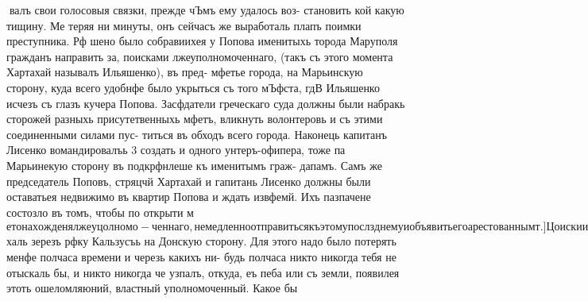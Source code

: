 валъ свои голосовыя связки, прежде чЪмъ ему удалось воз-
становить кой какую тищину. Ме теряя ни минуты, онъ
сейчасъ же выработаль плапъ поимки преступника. Рф шено
было собравиихея у Попова именитыхь торода Маруполя
гражданъ направить за, поисками лжеуполномоченнаго, (такъ
съ этого момента Хартахай называлъ Ильяшенко), въ пред-
мфетье города, на Марьинскую сторону, куда всего удобнфе
было укрыться съ того мЪфста, гдВ Ильяшенко исчезъ съ
глазъ кучера Попова. Засфдатели греческаго суда должны
были набракь сторожей разныхь присутетвенныхь мфетъ,
вликнуть волонтеровь и съ этими соединенными силами пус-
титься въ обходъ всего города. Наконець капитанъ Лисенко
вомандировалъь 3 создать и одного унтеръ-офипера, тоже па
Марьинекую сторону въ подкрфнлеше къ именитымъ граж-
дапамъ. Самъ же председатель Поповъ, стряцчй Хартахай
и гапитань Лисенко должны были оставатьея недвижимо въ
квартир Попова и ждать извфемй. Ихъ пазпачене состозло
въ томъ, чтобы по открыти м$етонахожденя лжеуцолномо-
ченнаго, немедленно отправиться къ этому послзднему и
объявить его арестованнымт. ]

Цоиски имепитыхь гражданъ и соединеннаго отрада,
руководимаго засфдателями были безуспВшны; на воз ихъ
разсироем имъ отвьфчали, что никакой назальвикь нигдф не
проявлялея. Они ошибочно искали чрезвычайныхь зваменй
чрезвычайнато уполномоченнаго въ видф развфвающатося флага
надь домомъ, занимаемомъ этимъ послфднимъ, или въ вид.
полосатой будки съ заключеннымъ въ ней полицейскимъ и
т. п. Но такихь знамен! не дано было имъ открыть. Име-
нитые граждане ходили толпой, горячо разговаривали, спо-
рили и тоже пичего знаменательнаго не открыли. Носланные
же капитаномъ солдатики замЪтили возлВ одной изъ хать
на Марьипской сторонЪ ту самую одноконную повозку, на
м фи рее

которой Ильяшенко и его товарищи наканунф въЪхали въ
г. Мар!уполь. Солдатики уклонились оть сложныхь разсу-
‘жденй и непосредственио рфшили, что эта повозка никого
иного, канъ только начальника, вЪротно въ пользу этого
быстраго заключен!я говорило то обетоятельетво, что мфетное
павелеше не пользовалось одноконными телфгами, а упот-
ребляло двухконныя, похозйя на современные фургоны. Одинъ
солдатикъ, подкравшись, заглянуть въ окно и увидёль че-
ловЪка, растянувшагося на лавьВ; кавъ заглянув въ окно,
такъ и его товарищи опять непосредственно уфшили, что
никому иному не растягиваться на завьВ, какъ только на-
чальнику и побЪжали отрапортовать о своей находеЁ капи-
тану Лисенко.

Впередь каюсь; на одну минуту я измёню своей роли
лВтониеда-протоколиста и не воздержусь отъ упрека, который
мн хочется бросить Ильяшенко. Мн хочется ему сказать:
„Ильяшенко, Ильяшенко, почто ты, ‘нагрузившись достаточно
за обфдомъ у Попова, напилея окончательно пьянъ, придя
домой. Зачфмъ ты, спровадивъ кучера Попова, не запрегъ
своей лошади и вмВетф съ твоими товарищами ве пере$халь
зерезъ рфку Кальзусъь на Донскую сторону. Для этого надо
было потерять менфе полчаса времени и черезь какихъ ни-
будь полчаса никто никогда тебя не отыскаль бы, и никто
никогда че узпалъ, откуда, еъ пеба или съ земли, появилея
этоть ошеломляюний, властный уполномоченный. Какое бы

